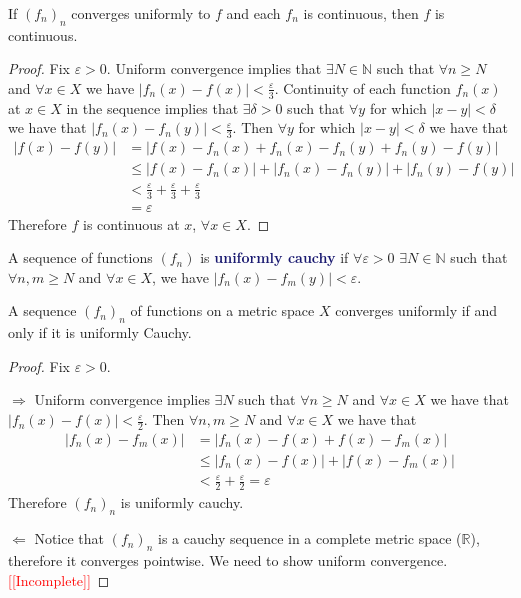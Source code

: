 \documentclass[11pt]{article}
\numberwithin{equation}{section}
\newcommand{\navy}[1]{\textcolor{MidnightBlue}{\bf #1}}
\theoremstyle{definition}
\theoremstyle{definition}
\def\imp{\Rightarrow}
\def\pmi{\Leftarrow}
\newcommand{\1}{\mathbbm 1}
\def\d{\delta}
\newcommand{\e}{\varepsilon}
\newcommand{\RR}{\mathbb R}
\newcommand{\NN}{\mathbb N}
\begin{document}
\begin{theorem}
	If $(f_n)_n$ converges uniformly to $f$ and each $f_n$ is continuous, then $f$ is continuous.
\end{theorem}
\begin{proof}
	Fix $\e > 0$. Uniform convergence implies that $\exists N \in \NN$ such that $\forall n \geq N$ and $\forall x \in X$ we have $|f_n(x) - f(x)| < \frac{\e}{3}$. Continuity of each function $f_n(x)$ at $x \in X$ in the sequence implies that $\exists \d > 0$ such that $\forall y$ for which $|x - y| < \d$ we have that $|f_n(x) - f_n(y)| < \frac{\e}{3}$. Then $\forall y$ for which $|x - y| < \d$ we have that
	\begin{align*}
		|f(x) - f(y)| &= |f(x)- f_n(x) + f_n(x) - f_n(y) + f_n(y) - f(y)| \\
		&\leq |f(x)- f_n(x)| + |f_n(x) - f_n(y)| + |f_n(y) - f(y)| \tag{$\Delta$} \\
		&< \frac{\e}{3} + \frac{\e}{3} + \frac{\e}{3} \tag{uniform convergence and continuity of $f_n$ at $x$} \\
		&= \e
	\end{align*}
	Therefore $f$ is continuous at $x$, $\forall x \in X$.   
\end{proof}

\begin{definition}
	A sequence of functions $(f_n)$ is \navy{uniformly cauchy} if $\forall \e > 0$ $\exists N \in \NN$ such that $\forall n,m \geq N$ and $\forall x \in X$, we have $|f_n(x) - f_m(y)| < \e$. 
\end{definition}


\begin{theorem}
	A sequence $(f_n)_n$ of functions on a metric space $X$ converges uniformly if and only if it is uniformly Cauchy.
\end{theorem}
\begin{proof} Fix $\e > 0$.

	$\imp$ Uniform convergence implies $\exists N$ such that $\forall n \geq N$ and $\forall x \in X$ we have that $|f_n(x)-f(x)|<\frac{\e}{2}$. Then $\forall n,m \geq N$ and $\forall x \in X$ we have that
	\begin{align*}
		|f_n(x) - f_m(x)| &= |f_n(x) - f(x) + f(x) - f_m(x)| \\
		&\leq |f_n(x) - f(x)| + |f(x) - f_m(x)| \\
		&< \frac{\e}{2} + \frac{\e}{2} = \e
	\end{align*}
	Therefore $(f_n)_n$ is uniformly cauchy. 

	$\pmi$ Notice that $(f_n)_n$ is a cauchy sequence in a complete metric space ($\RR$), therefore it converges pointwise. We need to show uniform convergence. \textcolor{red}{[[Incomplete]]}
\end{proof}
\end{document}
